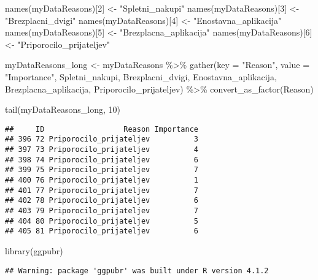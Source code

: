 \documentclass[
]{article}
\newenvironment{Shaded}{\begin{snugshade}}{\end{snugshade}}
\newcommand{\AttributeTok}[1]{\textcolor[rgb]{0.77,0.63,0.00}{#1}}
\newcommand{\DecValTok}[1]{\textcolor[rgb]{0.00,0.00,0.81}{#1}}
\newcommand{\FunctionTok}[1]{\textcolor[rgb]{0.00,0.00,0.00}{#1}}
\newcommand{\NormalTok}[1]{#1}
\newcommand{\OtherTok}[1]{\textcolor[rgb]{0.56,0.35,0.01}{#1}}
\newcommand{\SpecialCharTok}[1]{\textcolor[rgb]{0.00,0.00,0.00}{#1}}
\newcommand{\StringTok}[1]{\textcolor[rgb]{0.31,0.60,0.02}{#1}}
\begin{document}
\begin{Shaded}
\begin{Highlighting}[]
\FunctionTok{names}\NormalTok{(myDataReasons)[}\DecValTok{2}\NormalTok{] }\OtherTok{\textless{}{-}} \StringTok{"Spletni\_nakupi"}
\FunctionTok{names}\NormalTok{(myDataReasons)[}\DecValTok{3}\NormalTok{] }\OtherTok{\textless{}{-}} \StringTok{"Brezplacni\_dvigi"}
\FunctionTok{names}\NormalTok{(myDataReasons)[}\DecValTok{4}\NormalTok{] }\OtherTok{\textless{}{-}} \StringTok{"Enostavna\_aplikacija"}
\FunctionTok{names}\NormalTok{(myDataReasons)[}\DecValTok{5}\NormalTok{] }\OtherTok{\textless{}{-}} \StringTok{"Brezplacna\_aplikacija"}
\FunctionTok{names}\NormalTok{(myDataReasons)[}\DecValTok{6}\NormalTok{] }\OtherTok{\textless{}{-}} \StringTok{"Priporocilo\_prijateljev"}

\NormalTok{myDataReasons\_long }\OtherTok{\textless{}{-}}\NormalTok{ myDataReasons }\SpecialCharTok{\%\textgreater{}\%}
                 \FunctionTok{gather}\NormalTok{(}\AttributeTok{key =} \StringTok{"Reason"}\NormalTok{, }\AttributeTok{value =} \StringTok{"Importance"}\NormalTok{, Spletni\_nakupi, Brezplacni\_dvigi, Enostavna\_aplikacija, Brezplacna\_aplikacija, Priporocilo\_prijateljev) }\SpecialCharTok{\%\textgreater{}\%}
                 \FunctionTok{convert\_as\_factor}\NormalTok{(Reason)}


\FunctionTok{tail}\NormalTok{(myDataReasons\_long, }\DecValTok{10}\NormalTok{)}
\end{Highlighting}
\end{Shaded}

\begin{verbatim}
##     ID                  Reason Importance
## 396 72 Priporocilo_prijateljev          3
## 397 73 Priporocilo_prijateljev          4
## 398 74 Priporocilo_prijateljev          6
## 399 75 Priporocilo_prijateljev          7
## 400 76 Priporocilo_prijateljev          1
## 401 77 Priporocilo_prijateljev          7
## 402 78 Priporocilo_prijateljev          6
## 403 79 Priporocilo_prijateljev          7
## 404 80 Priporocilo_prijateljev          5
## 405 81 Priporocilo_prijateljev          6
\end{verbatim}

\begin{Shaded}
\begin{Highlighting}[]
\FunctionTok{library}\NormalTok{(ggpubr)}
\end{Highlighting}
\end{Shaded}

\begin{verbatim}
## Warning: package 'ggpubr' was built under R version 4.1.2
\end{verbatim}
\end{document}
